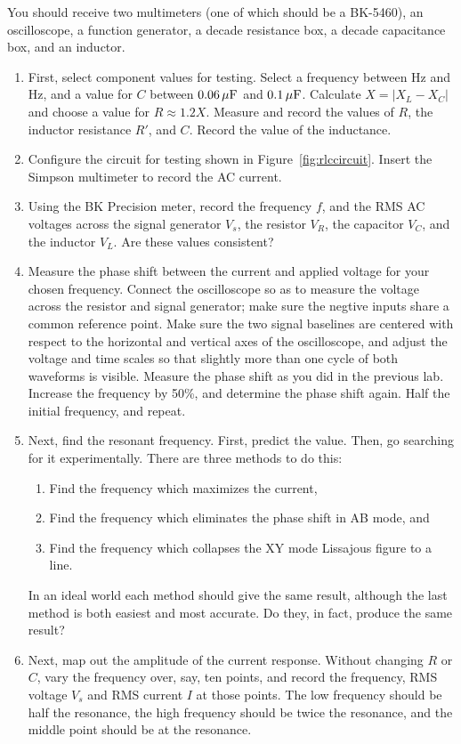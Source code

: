 \documentclass[12pt]{article}
\begin{document}
You should receive two multimeters (one of which should be a
BK-5460), an oscilloscope, a function generator, a
decade resistance box, a decade capacitance box, and an inductor.

\begin{enumerate}
\item First, select component values for testing.  Select a frequency
  between \unit[300]{Hz} and \unit[600]{Hz}, and a value for $C$
  between $\unit[0.06]{\mu F}$ and $\unit[0.1]{\mu F}$.  Calculate $X
  = \left| X_L-X_C \right|$ and choose a value for $R \approx 1.2 X$.
  Measure and record the values of $R$, the inductor resistance $R'$,
  and $C$.  Record the value of the inductance.
\item Configure the circuit for testing shown in
  Figure~\ref{fig:rlccircuit}.  Insert the Simpson multimeter to
  record the AC current.
\item Using the BK Precision meter, record the frequency $f$, and the
  RMS AC voltages across the signal generator $V_s$, the resistor
  $V_R$, the capacitor $V_C$, and the inductor $V_L$.  Are these
  values consistent?
\item \label{item:phase} Measure the phase shift between the current
  and applied voltage for your chosen frequency.  Connect the
  oscilloscope so as to measure the voltage across the resistor and
  signal generator; make sure the negtive inputs share a common
  reference point.  Make sure the two signal baselines are centered
  with respect to the horizontal and vertical axes of the
  oscilloscope, and adjust the voltage and time scales so that
  slightly more than one cycle of both waveforms is visible.  Measure
  the phase shift as you did in the previous lab.  Increase the
  frequency by 50\%, and determine the phase shift again.  Half the
  initial frequency, and repeat.
\item \label{item:resonance} Next, find the resonant frequency.
  First, predict the value.  Then, go searching for it experimentally.
  There are three methods to do this:
  \begin{enumerate}
  \item Find the frequency which maximizes the current, 
  \item Find the frequency which eliminates the phase shift in AB
    mode, and
  \item Find the frequency which collapses the XY mode Lissajous
    figure to a line.
  \end{enumerate}
  In an ideal world each method should give the same result, although
  the last method is both easiest and most accurate.  Do they, in
  fact, produce the same result?
\item \label{item:current} Next, map out the amplitude of the current
  response.  Without changing $R$ or $C$, vary the frequency over, say, ten
  points, and record the frequency, RMS voltage $V_s$ and RMS current
  $I$ at those points.  The low frequency should be half the
  resonance, the high frequency should be twice the resonance, and the
  middle point should be at the resonance.
\end{enumerate}
\end{document}
